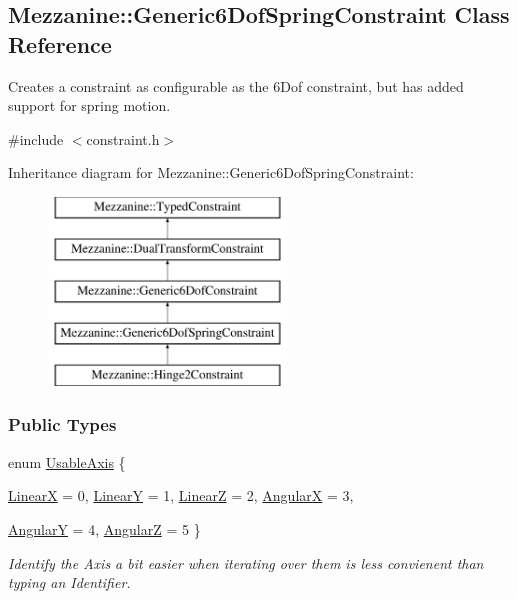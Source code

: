 \hypertarget{classMezzanine_1_1Generic6DofSpringConstraint}{
\subsection{Mezzanine::Generic6DofSpringConstraint Class Reference}
\label{classMezzanine_1_1Generic6DofSpringConstraint}
}


Creates a constraint as configurable as the 6Dof constraint, but has added support for spring motion.  




{\ttfamily \#include $<$constraint.h$>$}

Inheritance diagram for Mezzanine::Generic6DofSpringConstraint:\begin{figure}[H]
\begin{center}
\leavevmode
\includegraphics[height=5.000000cm]{classMezzanine_1_1Generic6DofSpringConstraint}
\end{center}
\end{figure}
\subsubsection*{Public Types}
\begin{DoxyCompactItemize}
\item 
enum \hyperlink{classMezzanine_1_1Generic6DofSpringConstraint_acdffbc070d80b5480bf1020d4a2351ed}{UsableAxis} \{ \par
\hyperlink{classMezzanine_1_1Generic6DofSpringConstraint_acdffbc070d80b5480bf1020d4a2351eda7970dfa1f659f13dc21fb5c1db80e010}{LinearX} =  0, 
\hyperlink{classMezzanine_1_1Generic6DofSpringConstraint_acdffbc070d80b5480bf1020d4a2351eda01f2486c7c0675ebe208cf57639cfb71}{LinearY} =  1, 
\hyperlink{classMezzanine_1_1Generic6DofSpringConstraint_acdffbc070d80b5480bf1020d4a2351eda7132163f87ca7bf7f9636ccc0f072a44}{LinearZ} =  2, 
\hyperlink{classMezzanine_1_1Generic6DofSpringConstraint_acdffbc070d80b5480bf1020d4a2351eda0cab58ba7b92e361bdd6015db24d000f}{AngularX} =  3, 
\par
\hyperlink{classMezzanine_1_1Generic6DofSpringConstraint_acdffbc070d80b5480bf1020d4a2351eda0e7a74d5d62a698720667afc5abf8901}{AngularY} =  4, 
\hyperlink{classMezzanine_1_1Generic6DofSpringConstraint_acdffbc070d80b5480bf1020d4a2351edacb681f499963ab2b5a9385877a5d4e5d}{AngularZ} =  5
 \}
\begin{DoxyCompactList}\small\item\em Identify the Axis a bit easier when iterating over them is less convienent than typing an Identifier. \item\end{DoxyCompactList}\end{DoxyCompactItemize}
